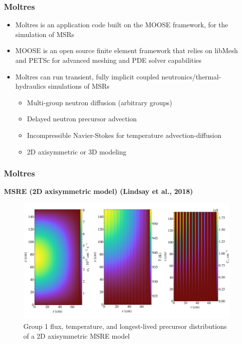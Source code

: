 \begin{frame}
	\frametitle{Moltres}
		\begin{itemize}
			\item Moltres is an application code built on the \gls{MOOSE}
			framework, for the simulation of \glspl{MSR}
			\item MOOSE is an open source finite element framework that
			relies on libMesh and PETSc for advanced meshing and PDE
			solver capabilities
			\item Moltres can run transient, fully implicit coupled
			neutronics/thermal-hydraulics simulations of \glspl{MSR}
			\begin{itemize}
				\item Multi-group neutron diffusion (arbitrary groups)
				\item Delayed neutron precursor advection
				\item Incompressible Navier-Stokes for temperature
				advection-diffusion
				\item 2D axisymmetric or 3D modeling
			\end{itemize}
		\end{itemize}
\end{frame}

\begin{frame}
	\frametitle{Moltres}
	\textbf{MSRE (2D axisymmetric model) (Lindsay et al., 2018)}
	\begin{figure}
		\centering
		\includegraphics[width=.9\textwidth]{./images/msre}
		\caption{Group 1 flux, temperature, and longest-lived
		precursor distributions of a 2D axisymmetric MSRE model}
	\end{figure}
\end{frame}